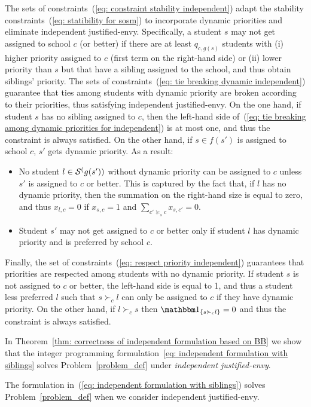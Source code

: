             The sets of constraints~(\ref{eq: constraint stability independent}) adapt the stability constraints~(\ref{eq: statibility for sosm}) to incorporate dynamic priorities and eliminate independent justified-envy. Specifically, a student \(s\) may not get assigned to school \(c\) (or better) if there are at least \(q_{c,g(s)}\) students with (i) higher priority assigned to \(c\) (first term on the right-hand side) or (ii) lower priority than \(s\) but that have a sibling assigned to the school, and thus obtain siblings' priority.
            The sets of constraints~(\ref{eq: tie breaking dynamic independent}) guarantee that ties among students with dynamic priority are broken according to their priorities, thus satisfying independent justified-envy. On the one hand, if student \(s\) has no sibling assigned to \(c\),
            then the left-hand side of~(\ref{eq: tie breaking among dynamic priorities for independent}) is at most one, and thus the constraint is always satisfied. On the other hand, if \(s\in f(s')\) is assigned to school \(c\), \(s'\) gets dynamic priority. As a result:
            \begin{itemize}
              \item No student \(l\in \mathcal{S}^(g(s'))\) without dynamic priority can be assigned to \(c\) unless \(s'\) is assigned to \(c\) or better. This is captured by the fact that, if \(l\) has no dynamic priority, then the summation on the right-hand size is equal to zero, and thus \(x_{l,c} = 0\) if \(x_{s,c} = 1\) and \(\sum_{c'\succeq_s c} x_{s,c'} = 0\).
              \item Student \(s'\) may not get assigned to \(c\) or better only if student \(l\) has dynamic priority and is preferred by school \(c\).
            \end{itemize}
            Finally, the set of constraints~(\ref{eq: respect priority independent}) guarantees that priorities are respected among students with no dynamic priority. If student \(s\) is not assigned to \(c\) or better, the left-hand side is equal to 1, and thus a student less preferred \(l\) such that \(s \succ_c l\) can only be assigned to \(c\) if they have dynamic priority. On the other hand, if \(l\succ_c s\) then \(\ind{s\succ_c l} = 0\) and thus the constraint is always satisfied.


            In Theorem~\ref{thm: correctness of independent formulation based on BB} we show that the integer programming formulation~\ref{eq: independent formulation with siblings} solves Problem~\ref{problem_def} under \emph{independent justified-envy}.
            \begin{theorem}\label{thm: correctness of independent formulation based on BB}
              The formulation in~(\ref{eq: independent formulation with siblings}) solves Problem~\ref{problem_def} when we consider independent justified-envy.
            \end{theorem}

